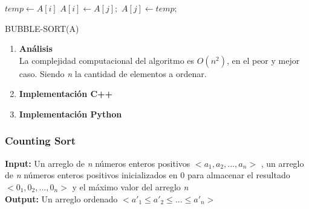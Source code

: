 \documentclass{article}
\begin{document}
		            \begin{algorithm}[H]
                        \begin{algorithmic}[1]
                                        \STATE $temp \gets A[i]$
                                        \STATE $A[i] \gets A[j];$ 
                                        \STATE $A[j] \gets temp;$
                                    \ENDIF    
                                \ENDFOR
                            \ENDFOR
                        \end{algorithmic}
                        \caption{BUBBLE-SORT(A)}
                        \label{alg:bubble-sort}
                    \end{algorithm}
                    
                    \begin{enumerate}
                        \item \textbf{An\'{a}lisis}\\
                            La complejidad computacional del algoritmo es $O(n^{2})$, en el peor y mejor caso. Siendo \textit{n} la cantidad de elementos a ordenar.
                            
                        \item \textbf{Implementaci\'{o}n C++}
                
                        
                        
                        \item \textbf{Implementaci\'{o}n Python}\\
                
                        
                        
                    \end{enumerate}
		            
		        \subsubsection{Counting Sort}
		            \begin{flushleft}
    		            \textbf{Input:} Un arreglo de \textit{n} números enteros positivos $<a_1,a_2,...,a_n>$ , un arreglo de \textit{n} números enteros positivos inicializados en 0 para almacenar el resultado $<0_1,0_2,...,0_n>$ y el máximo valor del arreglo \textit{n}  \\
    		            \textbf{Output:} Un arreglo ordenado $<a'_1 \leq a'_2 \leq ... \leq a'_n>$
		            \end{flushleft}
		            
\end{document}
